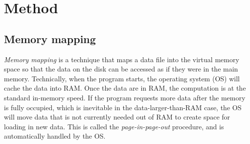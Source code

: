 
\section{Method}

\subsection{Memory mapping}

\textit{Memory mapping} \citep{bovet2005understanding} is a technique that maps a data file into the virtual memory space so that the data on the disk can be accessed as if they were in the main memory. Technically, when the program starts, the operating system (OS) will cache the data into RAM. Once the data are in RAM, the computation is at the standard in-memory speed. If the program requests more data after the memory is fully occupied, which is inevitable in the data-larger-than-RAM case, the OS will move data that is not currently needed out of RAM to create space for loading in new data. This is called the \textit{page-in-page-out} procedure, and is automatically handled by the OS.

